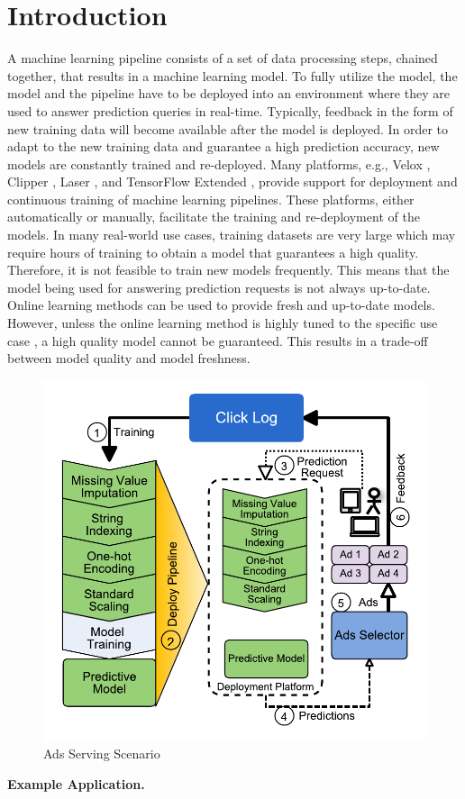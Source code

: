 \section{Introduction} \label{introduction}
A machine learning pipeline consists of a set of data processing steps, chained together, that results in a machine learning model.
To fully utilize the model,  the model and the pipeline have to be deployed into an environment where they are used to answer prediction queries in real-time.
Typically, feedback in the form of new training data will become available after the model is deployed.
In order to adapt to the new training data and guarantee a high prediction accuracy, new models are constantly trained and re-deployed.
Many platforms, e.g., Velox \cite{crankshaw2014missing}, Clipper \cite{crankshaw2016clipper}, Laser \cite{agarwal2014laser}, and TensorFlow Extended \cite{baylor2017tfx}, provide support for deployment and continuous training of machine learning pipelines. 
These platforms, either automatically or manually, facilitate the training and re-deployment of the models.
In many real-world use cases, training datasets are very large which may require hours of training to obtain a model that guarantees a high quality.
Therefore, it is not feasible to train new models frequently.
This means that the model being used for answering prediction requests is not always up-to-date.
Online learning methods can be used to provide fresh and up-to-date models.
However, unless the online learning method is highly tuned to the specific use case \cite{ma2009identifying}, a high quality model cannot be guaranteed.
This results in a trade-off between model quality and model freshness.

\begin{figure}[t]
\centering
\includegraphics[width=\columnwidth]{../images/motivational-example.pdf}
\caption{Ads Serving Scenario}
\label{fig:motivational-example}
\end{figure}
\textbf{Example Application.} 

